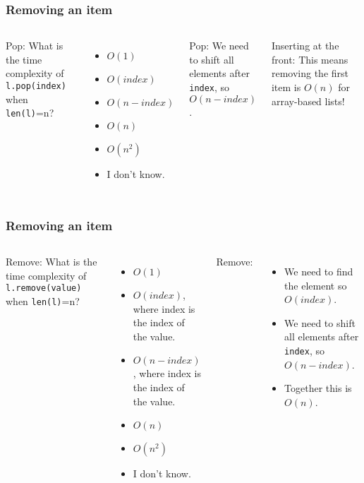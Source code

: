 \begin{frame}
	\frametitle{Removing an item}
	\begin{columns}
			Pop: What is the time complexity of \texttt{l.pop(index)} when \texttt{len(l)}=n?
			\begin{itemize}
				\item $O(1)$
				\item $O(\textit{index})$
				\item $O(n - \textit{index})$
				\item $O(n)$
				\item $O(n^2)$
				\item I don't know.
			\end{itemize}
		
			Pop: We need to shift all elements after \texttt{index}, so $O(n-\textit{index})$.
		
		Inserting at the front:
			This means removing the first item is $O(n)$ for array-based lists!
	\end{columns}
\end{frame}

\begin{frame}
	\frametitle{Removing an item}
	\begin{columns}
		\column{0.455\linewidth}
		Remove:
			What is the time complexity of \texttt{l.remove(value)} when \texttt{len(l)}=n?
			\begin{itemize}
				\item $O(1)$
				\item $O(\textit{index})$, where index is the index of the value.
				\item $O(n - \textit{index})$, where index is the index of the value.
				\item $O(n)$
				\item $O(n^2)$
				\item I don't know.
			\end{itemize}
		
		\column{0.455\linewidth}
		Remove:
		\begin{itemize}
			\item We need to find the element so $O(\textit{index})$.
			\item We need to shift all elements after \texttt{index}, so $O(n-\textit{index})$.
			\item Together this is $O(n)$.
		\end{itemize}
	\end{columns}
\end{frame}

